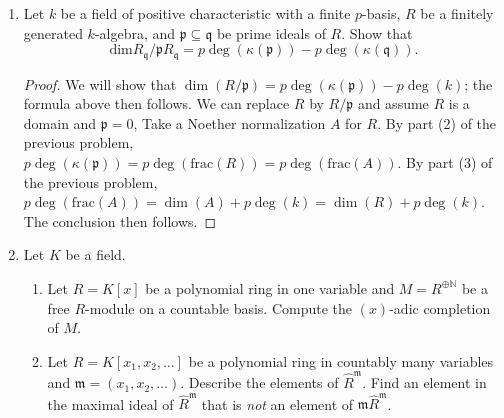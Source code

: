 \documentclass{amsart}[12pt]
\newcommand{\N}{\mathbb{N}}
\newcommand{\fp}{{\mathfrak p}}
\newcommand{\fm}{{\mathfrak m}}
\newcommand{\fq}{{\mathfrak q}}
\numberwithin{equation}{section}
\theoremstyle{plain} %
\theoremstyle{definition}
\theoremstyle{remark}
\begin{document}
\begin{enumerate}
\begin{proof} 
\begin{enumerate}
\item By induction on $e$, with $e=1$ as the definition. If the claim is true for $e$, so $T^{[<p^e]}$ is a basis for $L/L^{p^e}$, taking $p$th powers we have that $(T^p)^{[<p^e]}$ is a basis for $L^p / L^{p^{e+1}}$. But $T^{[<p^{e+1}]} = (T^p)^{[<p^e]} T^{[<p]}$ (i.e., the first set is the set of products of the two sets on the right-hand side), so from field theory, the left hand side is a basis for $L/ L^{p^{e+1}}$.
\item Consider the diagram
\[ \xymatrix{  & L & \\ L^p \ar[ur] & & K \ar[ul] \\ & K^p  \ar[ur]  \ar[ul] &  }\]
From field theory $[L:K][K:K^p] = [L^p : K^p][L:L^p]$, and $[L^p : K^p] = [L:K]$, so $[K:K^p] = [L:L^p]$. Then $p\deg(K)=\log_p([K:K^p]) = \log_p([L:L^p]) = p\deg(L)$.
\item Take a $p$-basis $T$ for $K$. One checks that $T \cup \{x_1,\dots,x_m\}$ is a $p$-basis for $L$.
\end{enumerate}
\end{proof}


\item Let $k$ be a field of positive characteristic with a finite $p$-basis, $R$ be a finitely generated $k$-algebra, and $\fp \subseteq \fq$ be prime ideals of $R$.
Show that 
\[ \mathrm{dim} R_\fq / \fp R_\fq = p\deg(\kappa(\fp)) - p\deg(\kappa(\fq)).\]


\begin{proof}
We will show that $\dim(R/\fp) = p\deg(\kappa(\fp)) - p\deg(k)$; the formula above then follows.
We can replace $R$ by $R/\fp$ and assume $R$ is a domain and $\fp=0$,  Take a Noether normalization $A$ for $R$. By part (2) of the previous problem, $p\deg(\kappa(\fp)) = p\deg(\mathrm{frac}(R)) = p\deg(\mathrm{frac}(A))$. By part (3) of the previous problem, $p\deg(\mathrm{frac}(A)) = \dim(A) + p\deg(k) =  \dim(R) + p\deg(k)$. The conclusion then follows.
\end{proof}

\item Let $K$ be a field.
\begin{enumerate}
\item Let $R=K[x]$ be a polynomial ring in one variable and $M= R^{\oplus \N}$ be a free $R$-module on a countable basis. Compute the $(x)$-adic completion of $M$.
\item Let $R=K[x_1,x_2,\dots]$ be a polynomial ring in countably many variables and $\fm=(x_1,x_2,\dots)$. Describe the elements of $\hat{R}^{\fm}$. Find an element in the maximal ideal of $\hat{R}^{\fm}$ that is \emph{not} an element of $\fm \hat{R}^\fm$.
\end{enumerate}


\end{enumerate}
\end{document}
